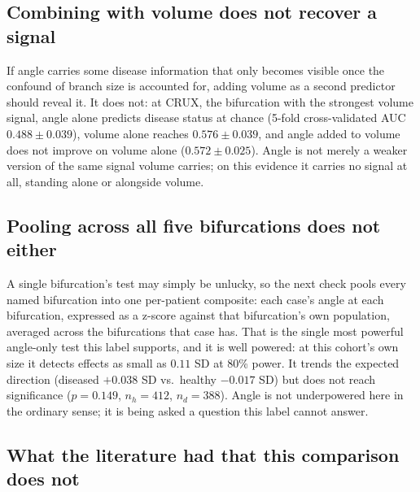 \subsection*{Combining with volume does not recover a signal}

If angle carries some disease information that only becomes visible once the confound of branch
size is accounted for, adding volume as a second predictor should reveal it. It does not: at CRUX,
the bifurcation with the strongest volume signal, angle alone predicts disease status at chance
(5-fold cross-validated AUC $0.488 \pm 0.039$), volume alone reaches $0.576 \pm 0.039$, and angle
added to volume does not improve on volume alone ($0.572 \pm 0.025$). Angle is not merely a weaker
version of the same signal volume carries; on this evidence it carries no signal at all, standing
alone or alongside volume.

\subsection*{Pooling across all five bifurcations does not either}

A single bifurcation's test may simply be unlucky, so the next check pools every named bifurcation
into one per-patient composite: each case's angle at each bifurcation, expressed as a z-score
against that bifurcation's own population, averaged across the bifurcations that case has. That is
the single most powerful angle-only test this label supports, and it is well powered: at this
cohort's own size it detects effects as small as $0.11$ SD at 80\% power. It trends the expected
direction (diseased $+0.038$ SD vs.\ healthy $-0.017$ SD) but does not reach significance
($p = 0.149$, $n_h = 412$, $n_d = 388$). Angle is not underpowered here in the ordinary sense; it is
being asked a question this label cannot answer.

\subsection*{What the literature had that this comparison does not}

